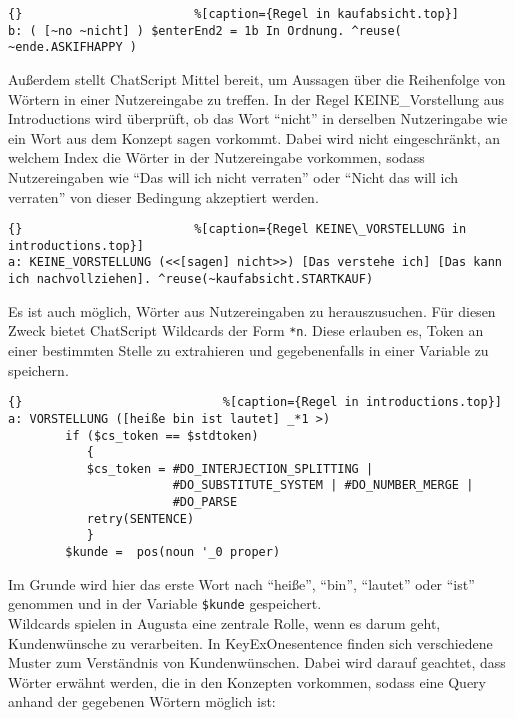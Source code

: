 \begin{lstlisting}{}						%[caption={Regel in kaufabsicht.top}]
b: ( [~no ~nicht] ) $enterEnd2 = 1b In Ordnung. ^reuse( ~ende.ASKIFHAPPY )
\end{lstlisting}

Außerdem stellt ChatScript Mittel bereit, um Aussagen über die Reihenfolge von Wörtern in einer Nutzereingabe zu treffen. In der Regel KEINE\_Vorstellung aus Introductions wird überprüft, ob das Wort "`nicht"' in derselben Nutzeringabe wie ein Wort aus dem Konzept \texttildelow sagen vorkommt. Dabei wird nicht eingeschränkt, an welchem Index die Wörter in der Nutzereingabe vorkommen, sodass Nutzereingaben wie "`Das will ich nicht verraten"' oder "`Nicht das will ich verraten"' von dieser Bedingung akzeptiert werden. 

\begin{lstlisting}{}						%[caption={Regel KEINE\_VORSTELLUNG in introductions.top}]
a: KEINE_VORSTELLUNG (<<[sagen] nicht>>) [Das verstehe ich] [Das kann ich nachvollziehen]. ^reuse(~kaufabsicht.STARTKAUF)
\end{lstlisting}

Es ist auch möglich, Wörter aus Nutzereingaben zu herauszusuchen. Für diesen Zweck bietet ChatScript Wildcards der Form \lstinline|*n|. Diese erlauben es, Token an einer bestimmten Stelle zu extrahieren und gegebenenfalls in einer Variable zu speichern. 

\begin{lstlisting}{}							%[caption={Regel in introductions.top}]
a: VORSTELLUNG ([heiße bin ist lautet] _*1 >)
	    if ($cs_token == $stdtoken)
           {
           $cs_token = #DO_INTERJECTION_SPLITTING |
                       #DO_SUBSTITUTE_SYSTEM | #DO_NUMBER_MERGE |
                       #DO_PARSE
           retry(SENTENCE)
           }
        $kunde =  pos(noun '_0 proper)
\end{lstlisting}

Im Grunde wird hier das erste Wort nach "`heiße"', "`bin"', "`lautet"' oder "`ist"' genommen und in der Variable \lstinline|$kunde| gespeichert. \\

Wildcards spielen in Augusta eine zentrale Rolle, wenn es darum geht, Kundenwünsche zu verarbeiten. In KeyExOnesentence finden sich verschiedene Muster zum Verständnis von Kundenwünschen. Dabei wird darauf geachtet, dass Wörter erwähnt werden, die in den Konzepten vorkommen, sodass eine Query anhand der gegebenen Wörtern möglich ist: 

